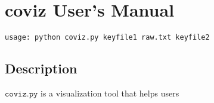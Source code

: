 \documentclass[a4paper]{article}
\begin{document}
\section*{coviz User's Manual}
\begin{verbatim}
usage: python coviz.py keyfile1 raw.txt keyfile2
\end{verbatim}

\subsection*{Description}
$\texttt{coviz.py}$ is a visualization tool that helps users 
\end{document}
